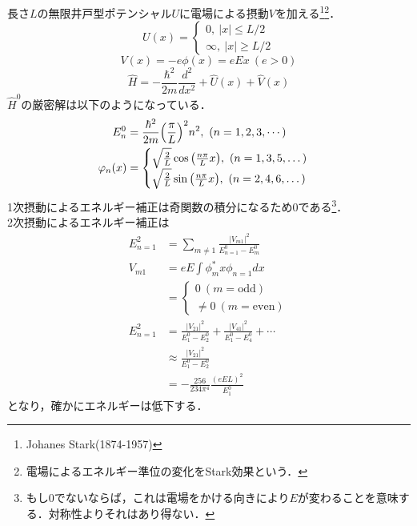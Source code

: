 \documentclass{report}
\begin{document}
  長さ$L$の無限井戸型ポテンシャル$U$に電場による摂動$V$を加える\footnote{
    Johanes Stark(1874-1957)
  }\footnote{
    電場によるエネルギー準位の変化をStark効果という．
  }．
  \begin{equation}
    U(x)=
    \begin{cases}
      0,\ \lvert x \rvert \le L/2\\
      \infty,\ \lvert x \rvert \ge L/2
    \end{cases}
  \end{equation}
  \begin{equation}
    V(x)=-e\phi(x)=eEx\ (e>0)
  \end{equation}
  \begin{equation}
    \hat{H}=-\frac{\hbar^2}{2m}\frac{d^2}{dx^2}+\hat{U}(x)+\hat{V}(x)
  \end{equation}
  $\hat{H}^0$の厳密解は以下のようになっている．
  \begin{align}
    E_n^0&=\frac{\hbar^2}{2m}\qty(\frac{\pi}{L})^2n^2,\ (n=1,2,3,\cdots)\\
    \phi_n(x)&=
    \begin{cases}
    \sqrt{\frac{2}{L}}\cos\qty(\frac{n\pi}{L}x),\ (n=1,3,5,\dots)\\
    \sqrt{\frac{2}{L}}\sin\qty(\frac{n\pi}{L}x),\ (n=2,4,6,\dots)
    \end{cases}
  \end{align}
  1次摂動によるエネルギー補正は奇関数の積分になるため0である\footnote{もし0でないならば，これは電場をかける向きにより$E$が変わることを意味する．対称性よりそれはあり得ない．}．\\
  2次摂動によるエネルギー補正は
  \begin{align}
    E_{n=1}^2&=\sum_{m\ne 1}\frac{\lvert V_{m1}\rvert^2}{E_{n=1}^0-E_m^0}\\
    V_{m1}&=eE\int\phi_m^{*}x\phi_{n=1}dx\\
    &=
    \begin{cases}
    0\ (m=\mathrm{odd})\\
    \ne 0\ (m=\mathrm{even})
    \end{cases}\\
    E_{n=1}^2&=\frac{\lvert V_{21}\rvert^2}{E_1^0-E_2^0}+\frac{\lvert V_{41}\rvert^2}{E_1^0-E_4^0}+\cdots\\
    &\approx\frac{\lvert V_{21}\rvert^2}{E_1^0-E_2^0}\\
    &=-\frac{256}{234\pi^4}\frac{(eEL)^2}{E_1^0}
  \end{align}
  となり，確かにエネルギーは低下する．
\end{document}
